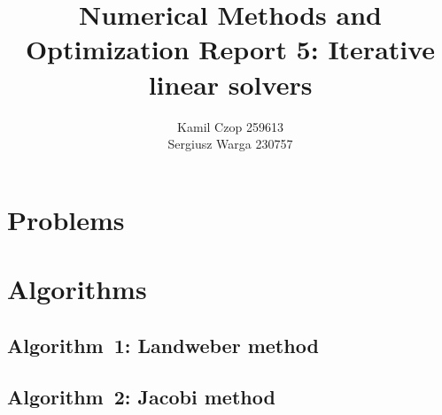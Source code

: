 \documentclass[a4paper]{article}
\title{Numerical Methods and Optimization Report 5:
Iterative linear solvers}
\author{Kamil Czop 259613\\Sergiusz Warga 230757}
\begin{document}
\maketitle
\tableofcontents
\listoftodos
\pagebreak

\section{Problems}



\clearpage

\section{Algorithms}
\subsection{Algorithm~1: Landweber method}%
\label{algorithm:1}

\subsection{Algorithm~2: Jacobi method}%
\label{algorithm:2}
% 
% 
% 


\clearpage

\nocite{Zdunek, GoluVanl96, Meyer}


\end{document}
